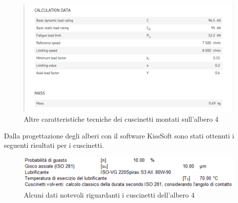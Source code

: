 \begin{figure}[h]
    \centering
    \includegraphics[scale=0.6]{Immagini/Cuscinetti2Albero4.png}
    \caption{Altre caratteristiche tecniche dei cuscinetti montati sull'albero 4}
    \label{fig:Cuscinetti2Albero4}
\end{figure}

Dalla progettazione degli alberi con il software KissSoft sono stati ottenuti i seguenti risultati per i cuscinetti.
\begin{figure}[h]
    \centering
    \includegraphics[scale=0.6]{Immagini/DettagliCuscinettiAlbero4.png}
    \caption{Alcuni dati notevoli riguardanti i cuscinetti dell'albero 4}
    \label{fig:DettagliCuscinettiAlbero4}
\end{figure}

